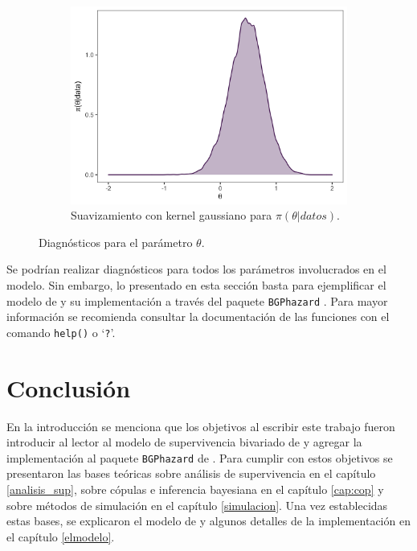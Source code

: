 \documentclass[11pt,a4paper]{article}
\begin{document}
\begin{figure}[!htb]
    \vspace{0.2cm}
    \begin{subfigure}[t]{\textwidth}
    \centering\includegraphics[width=\linewidth]{theta_densities.png}
    \caption{Suavizamiento con kernel gaussiano para $\pi (\theta | datos)$.}
    \label{fig:theta_densities}
    \end{subfigure}
     \caption{Diagnósticos para el parámetro $\theta$. }
    \label{fig:theta}
\end{figure}

Se podrían realizar diagnósticos para todos los parámetros involucrados en el modelo. Sin embargo, lo presentado en esta sección basta para ejemplificar el modelo de \citet{nieto} y su implementación a través del paquete \texttt{BGPhazard} \citep{bgphazard}. Para mayor información se recomienda consultar la documentación de las funciones con el comando \texttt{help()} o `\texttt{?}'.

\clearpage
\newpage

\section{Conclusión}

En la introducción se menciona que los objetivos al escribir este trabajo fueron introducir al lector al modelo de supervivencia bivariado de \citet{nieto} y agregar la implementación al paquete \texttt{BGPhazard} de \citet{bgphazard}. Para cumplir con estos objetivos se presentaron las bases teóricas sobre análisis de supervivencia en el capítulo \ref{analisis_sup}, sobre cópulas e inferencia bayesiana en el capítulo \ref{cap:cop} y sobre métodos de simulación en el capítulo \ref{simulacion}. Una vez establecidas estas bases, se explicaron el modelo de \citet{nieto} y algunos detalles de la implementación en el capítulo \ref{elmodelo}.
\end{document}
